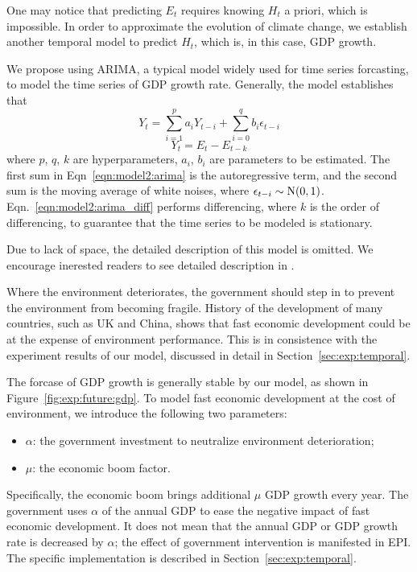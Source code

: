 One may notice that predicting $E_t$ requires knowing $H_{t}$ a priori, which is impossible. In order to approximate the evolution of climate change, we establish another temporal model to predict $H_t$, which is, in this case, GDP growth. 

We propose using ARIMA, a typical model widely used for time series forcasting, to model the time series of GDP growth rate.
Generally, the model establishes that
\begin{equation}
   Y_t = \sum_{i=1}^p a_i Y_{t-i} +\sum_{i=0}^q b_i \epsilon_{t-i}
   \label{eqn:model2:arima}
\end{equation}
\begin{equation}
   Y_t = E_t - E_{t-k}
   \label{eqn:model2:arima_diff}
\end{equation}
where $p$, $q$, $k$ are hyperparameters, $a_i$, $b_i$ are parameters to be estimated. 
The first sum in Eqn~\ref{eqn:model2:arima} is the autoregressive term, and the second sum is the moving average of white noises, where $\epsilon_{t-i}\sim \rm{N}(0,1)$. Eqn.~\ref{eqn:model2:arima_diff} performs differencing, where $k$ is the order of differencing, to guarantee that the time series to be modeled is stationary.

Due to lack of space, the detailed description of this model is omitted. We encourage inerested readers to see detailed description in \cite{hamilton1994time}.

Where the environment deteriorates, the government should step in to prevent the environment from becoming fragile. 
History of the development of many countries, such as UK and China, shows that fast economic development could be at the expense of environment performance. 
This is in consistence with the experiment results of our model, discussed in detail in Section~\ref{sec:exp:temporal}.

The forcase of GDP growth is generally stable by our model, as shown in Figure~\ref{fig:exp:future:gdp}. To model fast economic development at the cost of environment, we introduce the following two parameters:
\begin{itemize}
  \item $\alpha$: the government investment to neutralize environment deterioration;
  \item $\mu$: the economic boom factor.
\end{itemize}
Specifically, the economic boom brings additional $\mu$ GDP growth every year. The government uses $\alpha$ of the annual GDP to ease the negative impact of fast economic development. It does not mean that the annual GDP or GDP growth rate is decreased by $\alpha$; the effect of government intervention is manifested in EPI. The specific implementation is described in Section~\ref{sec:exp:temporal}.

